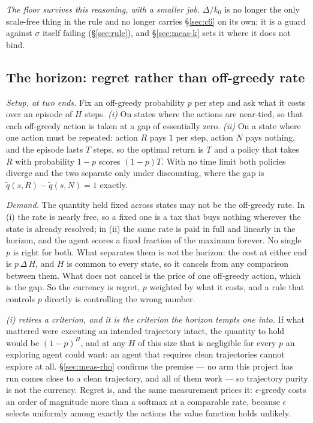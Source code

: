 \documentclass{article}
\newcommand{\gap}{\Delta}
\newcommand{\gapbar}{\overline{\Delta}}
\newcommand{\srank}{\sigma}
\begin{document}
\emph{The floor survives this reasoning, with a smaller job.} $\gapbar/k_0$ is no longer the only
scale-free thing in the rule and no longer carries \S\ref{sec:c6} on its own; it is a guard
against $\srank$ itself failing (\S\ref{sec:rule}), and \S\ref{sec:meas-k} sets it where it does
not bind.

\subsection{The horizon: regret rather than off-greedy rate}
\label{sec:c7}

\emph{Setup, at two ends.} Fix an off-greedy probability $p$ per step and ask what it costs over
an episode of $H$ steps.
\emph{(i)} On states where the actions are near-tied, so that each off-greedy action is taken at
a gap of essentially zero.
\emph{(ii)} On a state where one action must be repeated: action $R$ pays $1$ per step, action
$N$ pays nothing, and the episode lasts $T$ steps, so the optimal return is $T$ and a policy that
takes $R$ with probability $1-p$ scores $(1-p)T$. With no time limit both policies diverge and
the two separate only under discounting, where the gap is $\tilde{q}(s,R) - \tilde{q}(s,N) = 1$
exactly.

\emph{Demand.} The quantity held fixed across states may not be the off-greedy rate. In (i) the
rate is nearly free, so a fixed one is a tax that buys nothing wherever the state is already
resolved; in (ii) the same rate is paid in full and linearly in the horizon, and the agent scores
a fixed fraction of the maximum forever. No single $p$ is right for both. What separates them is
\emph{not} the horizon: the cost at either end is $p\,\gap\,H$, and $H$ is common to every state,
so it cancels from any comparison between them. What does not cancel is the price of one
off-greedy action, which is the gap. So the currency is regret, $p$ weighted by what it costs,
and a rule that controls $p$ directly is controlling the wrong number.

\emph{(i) retires a criterion, and it is the criterion the horizon tempts one into.} If what
mattered were executing an intended trajectory intact, the quantity to hold would be $(1-p)^{H}$,
and at any $H$ of this size that is negligible for every $p$ an exploring agent could want: an
agent that requires clean trajectories cannot explore at all. \S\ref{sec:meas-rho} confirms the
premise --- no arm this project has run comes close to a clean trajectory, and all of them work
--- so trajectory purity is not the currency. Regret is, and the same measurement prices it:
$\epsilon$-greedy costs an order of magnitude more than a softmax at a comparable rate, because
$\epsilon$ selects uniformly among exactly the actions the value function holds unlikely.
\end{document}
